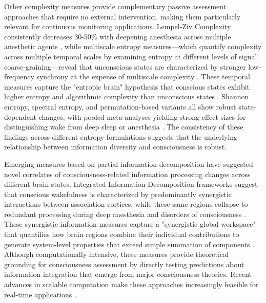 \documentclass[11pt,a4paper]{article}
\begin{document}
Other complexity measures provide complementary passive assessment approaches that require no external intervention, making them particularly relevant for continuous monitoring applications. Lempel-Ziv Complexity consistently decreases 30-50\% with deepening anesthesia across multiple anesthetic agents \citep{Zhang2001, Schartner2015}, while multiscale entropy measures—which quantify complexity across multiple temporal scales by examining entropy at different levels of signal coarse-graining—reveal that unconscious states are characterized by stronger low-frequency synchrony at the expense of multiscale complexity \citep{Liu2019}. These temporal measures capture the "entropic brain" hypothesis that conscious states exhibit higher entropy and algorithmic complexity than unconscious states \citep{Carhart-Harris2014}. Shannon entropy, spectral entropy, and permutation-based variants all show robust state-dependent changes, with pooled meta-analyses yielding strong effect sizes for distinguishing wake from deep sleep or anesthesia \citep{Liu2023, Schartner2015}. The consistency of these findings across different entropy formulations suggests that the underlying relationship between information diversity and consciousness is robust.

Emerging measures based on partial information decomposition \citep{Williams2010, Mediano2022} have suggested novel correlates of consciousness-related information processing changes across different brain states. Integrated Information Decomposition frameworks suggest that conscious wakefulness is characterized by predominantly synergistic interactions between association cortices, while these same regions collapse to redundant processing during deep anesthesia and disorders of consciousness \citep{Luppi2022}. These synergistic information measures capture a "synergistic global workspace" \citep{Luppi2022} that quantifies how brain regions combine their individual contributions to generate system-level properties that exceed simple summation of components \citep{Mediano2022}. Although computationally intensive, these measures provide theoretical grounding for consciousness assessment by directly testing predictions about information integration that emerge from major consciousness theories. Recent advances in scalable computation make these approaches increasingly feasible for real-time applications \citep{gutknecht2025shannon}.
\end{document}
